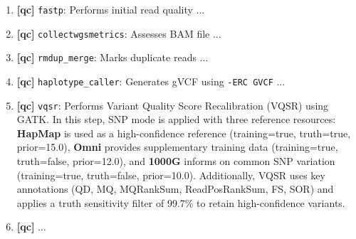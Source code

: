 \begin{tcolorbox}[
    breakable,  %
    colback=white!0,  %
    colframe=black,  %
    boxrule=1pt,  %
    arc=1mm,  %
    outer arc=1mm,
         title=\textbf{\refstepcounter{myboxcounter}\label{box:qv_description_example}Box \themyboxcounter: Example QV descriptions - extract from QV1 variables file}
]


\begin{enumerate}
    \item \textbf{[\ac{qc}]} \colorbox{kispiblue!30}{\texttt{fastp}}: Performs initial read quality ...
    \item \textbf{[\ac{qc}]} \colorbox{kispiblue!30}{\texttt{collectwgsmetrics}}: Assesses BAM file ...
    \item \textbf{[\ac{qc}]} \colorbox{kispiblue!30}{\texttt{rmdup\_merge}}: Marks duplicate reads ...
    \item \textbf{[\ac{qc}]} \colorbox{kispiblue!30}{\texttt{haplotype\_caller}}: Generates gVCF using \texttt{-ERC GVCF} ...
    \item \textbf{[\ac{qc}]} \colorbox{kispiblue!30}{\texttt{vqsr}}: Performs Variant Quality Score Recalibration (VQSR) using GATK. In this step, SNP mode is applied with three reference resources: \textbf{HapMap} is used as a high-confidence reference (training=true, truth=true, prior=15.0), \textbf{Omni} provides supplementary training data (training=true, truth=false, prior=12.0), and \textbf{1000G} informs on common SNP variation (training=true, truth=false, prior=10.0). Additionally, VQSR uses key annotations (QD, MQ, MQRankSum, ReadPosRankSum, FS, SOR) and applies a truth sensitivity filter of 99.7\% to retain high-confidence variants.
   \item \textbf{[\ac{qc}]} ...
\end{enumerate}


\end{tcolorbox}

\begin{tcolorbox}[
    breakable,  %
    colback=white!0,  %
    colframe=black,  %
    boxrule=1pt,  %
    arc=1mm,  %
    outer arc=1mm,
    title=\textbf{\refstepcounter{myboxcounter}\label{box:qv_bash_code_example}Box \themyboxcounter: Example code sourcing the variables file}
]


\end{tcolorbox}

